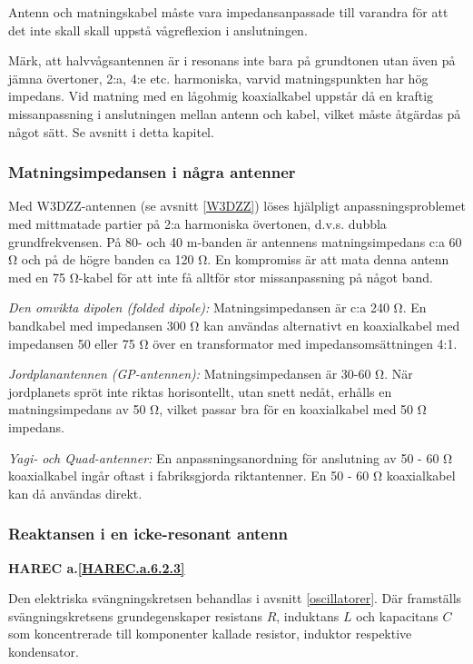 Antenn och matningskabel måste vara impedansanpassade till varandra
för att det inte skall skall uppstå vågreflexion i anslutningen.

Märk, att halvvågsantennen är i resonans inte bara på grundtonen utan
även på jämna övertoner, 2:a, 4:e etc. harmoniska, varvid
matningspunkten har hög impedans.  Vid matning med en lågohmig
koaxialkabel uppstår då en kraftig missanpassning i anslutningen
mellan antenn och kabel, vilket måste åtgärdas på något sätt. Se
avsnitt \label{transmissionsledningar} i detta kapitel.

\subsubsection{Matningsimpedansen i några antenner}
Med W3DZZ-antennen (se avsnitt \ref{W3DZZ}) löses hjälpligt anpassningsproblemet med
mittmatade partier på 2:a harmoniska övertonen, d.v.s. dubbla
grundfrekvensen. På 80- och 40 m-banden är antennens matningsimpedans
c:a 60 Ω och på de högre banden ca 120 Ω. En kompromiss är att mata
denna antenn med en 75 Ω-kabel för att inte få alltför stor
missanpassning på något band.

\emph{Den omvikta dipolen (folded dipole):}
Matningsimpedansen är c:a 240 Ω. En bandkabel med impedansen 300 Ω kan
användas alternativt en koaxialkabel med impedansen 50 eller 75 Ω över
en transformator med impedansomsättningen 4:1.

\emph{Jordplanantennen (GP-antennen):} Matningsimpedansen är 30-60
Ω. När jordplanets spröt inte riktas horisontellt, utan snett nedåt,
erhålls en matningsimpedans av 50 Ω, vilket passar bra för en
koaxialkabel med 50 Ω impedans.

\emph{Yagi- och Quad-antenner:} En anpassningsanordning för anslutning
av 50 - 60 Ω koaxialkabel ingår oftast i fabriksgjorda
riktantenner. En 50 - 60 Ω koaxialkabel kan då användas direkt.

\subsubsection{Reaktansen i en icke-resonant antenn}
\textbf{
HAREC a.\ref{HAREC.a.6.2.3}\label{myHAREC.a.6.2.3}
}

Den elektriska svängningskretsen behandlas i avsnitt \ref{oscillatorer}. Där framställs
svängningskretsens grundegenskaper resistans \(R\), induktans \(L\)
och kapacitans \(C\) som koncentrerade till komponenter kallade
resistor, induktor respektive kondensator.

